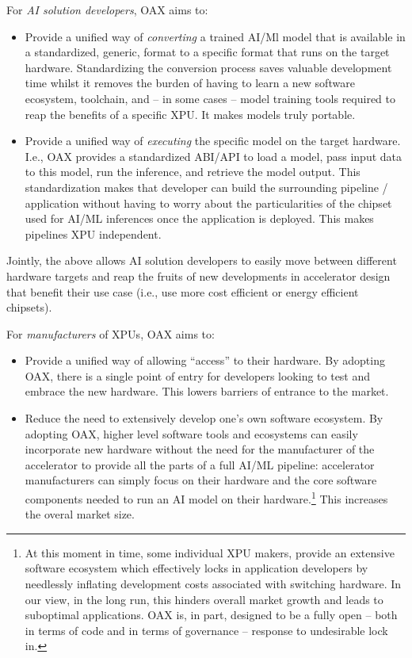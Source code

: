 \documentclass{article}
\begin{document}
For \emph{AI solution developers}, OAX aims to:
\begin{itemize}
\item Provide a unified way of \emph{converting} a trained AI/Ml model that is available in a standardized, generic, format to a specific format that runs on the target hardware. Standardizing the conversion process saves valuable development time whilst it removes the burden of having to learn a new software ecosystem, toolchain, and -- in some cases -- model training tools required to reap the benefits of a specific XPU. It makes models truly portable.
\item Provide a unified way of \emph{executing} the specific model on the target hardware. I.e., OAX provides a standardized ABI/API to load a model, pass input data to this model, run the inference, and retrieve the model output. This standardization makes that developer can build the surrounding pipeline / application without having to worry about the particularities of the chipset used for AI/ML inferences once the application is deployed. This makes pipelines XPU independent.
\end{itemize}

Jointly, the above allows AI solution developers to easily move between different hardware targets and reap the fruits of new developments in accelerator design that benefit their use case (i.e., use more cost efficient or energy efficient chipsets).

For \emph{manufacturers} of XPUs, OAX aims to:
\begin{itemize}
\item Provide a unified way of allowing ``access'' to their hardware. By adopting OAX, there is a single point of entry for developers looking to test and embrace the new hardware. This lowers barriers of entrance to the market.
\item Reduce the need to extensively develop one's own software ecosystem. By adopting OAX, higher level software tools and ecosystems can easily incorporate new hardware without the need for the manufacturer of the accelerator to provide all the parts of a full AI/ML pipeline: accelerator manufacturers can simply focus on their hardware and the core software components needed to run an AI model on their hardware.\footnote{At this moment in time, some individual XPU makers, provide an extensive software ecosystem which effectively locks in application developers by needlessly inflating development costs associated with switching hardware. In our view, in the long run, this hinders overall market growth and leads to suboptimal applications. OAX is, in part, designed to be a fully open -- both in terms of code and in terms of governance -- response to undesirable lock in.} This increases the overal market size.
\end{itemize}
\end{document}

